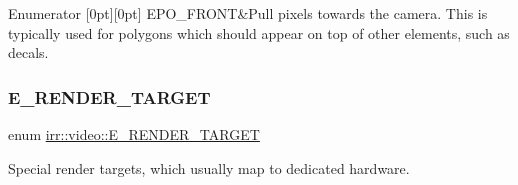 \begin{DoxyEnumFields}{Enumerator}
[0pt][0pt]{}\mbox{\label{namespaceirr_1_1video_a812b866b910c946f5bc813f8eab31144aff099fa22f7c0b397a1045e548a81704}} 
E\+P\+O\+\_\+\+F\+R\+O\+NT&Pull pixels towards the camera. This is typically used for polygons which should appear on top of other elements, such as decals. \\
\hline

\end{DoxyEnumFields}
\mbox{\label{namespaceirr_1_1video_a5b61a3f2bd5d458f76f2eb20b0f40972}} 
\subsubsection{\texorpdfstring{E\+\_\+\+R\+E\+N\+D\+E\+R\+\_\+\+T\+A\+R\+G\+ET}{E\_RENDER\_TARGET}\hspace{0.1cm}{\footnotesize\ttfamily [1/2]}}
{\footnotesize\ttfamily enum \hyperlink{namespaceirr_1_1video_a5b61a3f2bd5d458f76f2eb20b0f40972}{irr\+::video\+::\+E\+\_\+\+R\+E\+N\+D\+E\+R\+\_\+\+T\+A\+R\+G\+ET}}



Special render targets, which usually map to dedicated hardware. 

